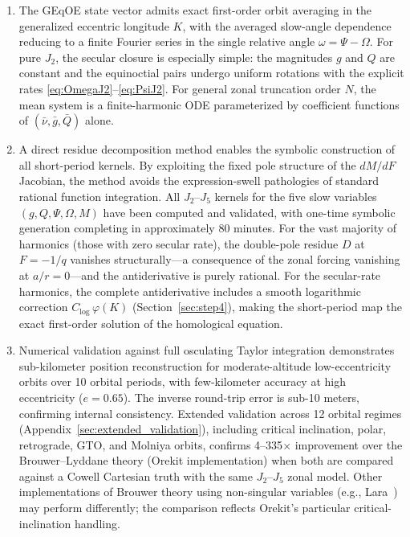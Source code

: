 \documentclass[11pt]{article}
\begin{document}
\begin{enumerate}
    \item The GEqOE state vector admits exact first-order orbit averaging in
    the generalized eccentric longitude $K$, with the averaged slow-angle
    dependence reducing to a finite Fourier series in the single relative
    angle $\omega = \Psi - \Omega$. For pure $J_2$, the secular closure is
    especially simple: the magnitudes $g$ and $Q$ are constant and the
    equinoctial pairs undergo uniform rotations with the explicit rates
    \eqref{eq:OmegaJ2}--\eqref{eq:PsiJ2}. For general zonal truncation
    order $N$, the mean system is a finite-harmonic ODE parameterized by
    coefficient functions of $(\bar\nu, \bar g, \bar Q)$ alone.

    \item A direct residue decomposition method enables the symbolic
    construction of all short-period kernels. By exploiting the fixed pole
    structure of the $dM/dF$ Jacobian, the method avoids the expression-swell
    pathologies of standard rational function integration.
    All $J_2$--$J_5$ kernels for the five slow variables
    $(g, Q, \Psi, \Omega, M)$ have been computed and validated, with one-time
    symbolic generation completing in approximately 80 minutes.
    For the vast majority of harmonics (those with zero secular rate), the
    double-pole residue $D$ at $F = -1/q$ vanishes structurally---a
    consequence of the zonal forcing vanishing at $a/r = 0$---and the
    antiderivative is purely rational.  For the secular-rate
    harmonics, the complete antiderivative includes a smooth logarithmic
    correction $C_{\log}\,\varphi(K)$ (Section~\ref{sec:step4}), making
    the short-period map the exact first-order solution of the homological
    equation.

    \item Numerical validation against full osculating Taylor integration
    demonstrates sub-kilometer position reconstruction for moderate-altitude
    low-eccentricity orbits over 10 orbital periods, with few-kilometer
    accuracy at high eccentricity ($e=0.65$).
    The inverse round-trip error is
    sub-10 meters, confirming internal consistency. Extended validation
    across 12 orbital regimes (Appendix~\ref{sec:extended_validation}),
    including critical inclination, polar, retrograde, GTO, and Molniya
    orbits, confirms 4--335$\times$ improvement over the Brouwer--Lyddane
    theory (Orekit implementation) when both are compared against a
    Cowell Cartesian truth with the same $J_2$--$J_5$ zonal model.
    Other implementations of Brouwer theory using non-singular variables
    (e.g., Lara~\cite{lara2021}) may perform differently; the comparison
    reflects Orekit's particular critical-inclination handling.


\end{enumerate}
\end{document}
